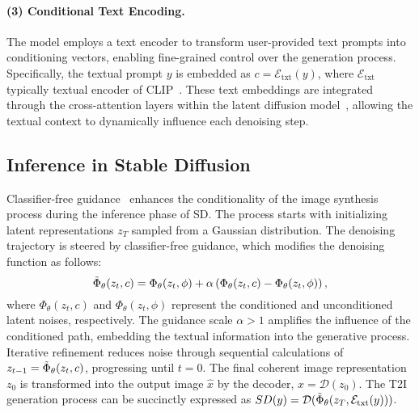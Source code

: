 \paragraph{(3) Conditional Text Encoding.} The model employs a text encoder to transform user-provided text prompts into conditioning vectors, enabling fine-grained control over the generation process. Specifically, the textual prompt $y$ is embedded as $c = \mathcal{E}_{\text{txt}}(y)$, where $\mathcal{E}_{\text{txt}}$ typically textual encoder of CLIP~\cite{CLIP}. These text embeddings are integrated through the cross-attention layers within the latent diffusion model~\cite{stable_diffusion}, allowing the textual context to dynamically influence each denoising step.

\subsection{Inference in Stable Diffusion}
Classifier-free guidance~\cite{ho2022classifier} enhances the conditionality of the image synthesis process during the inference phase of SD. The process starts with initializing latent representations $z_T$ sampled from a Gaussian distribution. The denoising trajectory is steered by classifier-free guidance, which modifies the denoising function as follows:
\begin{equation}\label{eq:classifier-free-guidance}
    \Tilde{\Phi}_{\theta}(z_t, c) = \Phi_{\theta}(z_t, \phi) + \alpha \left( \Phi_{\theta}(z_t, c) - \Phi_{\theta}(z_t, \phi) \right),
\end{equation}
where $\Phi_{\theta}(z_t, c)$ and $\Phi_{\theta}(z_t, \phi)$ represent the conditioned and unconditioned latent noises, respectively. The guidance scale $\alpha > 1$ amplifies the influence of the conditioned path, embedding the textual information into the generative process. 
Iterative refinement reduces noise through sequential calculations of $z_{t-1} = \Tilde{\Phi}_{\theta}(z_t, c)$, progressing until $t=0$. The final coherent image representation $z_0$ is transformed into the output image $\hat{x}$ by the decoder, $\hat{x} = \mathcal{D}(z_0)$. The T2I generation process can be succinctly expressed as $SD(y) = \mathcal{D}(\Tilde{\Phi}_{\theta}(z_T, \mathcal{E}_{\text{txt}}(y)))$.

